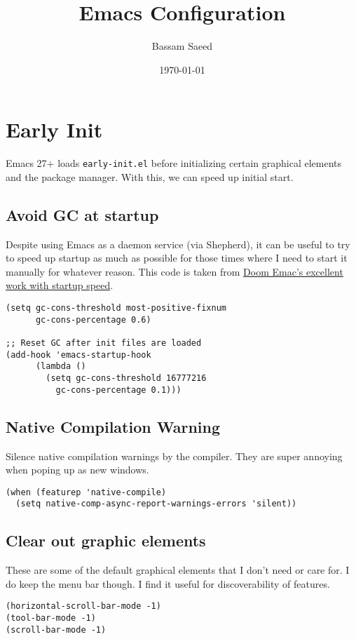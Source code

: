 \documentclass[11pt]{article}
\author{Bassam Saeed}
\date{\today}
\title{Emacs Configuration}
\begin{document}
\maketitle
\tableofcontents


\section{Early Init}
\label{sec:org3e512f7}
Emacs 27+ loads \texttt{early-init.el} before initializing certain graphical
elements and the package manager. With this, we can speed up initial
start.
\subsection{Avoid GC at startup}
\label{sec:org580bf67}
Despite using Emacs as a daemon service (via Shepherd), it can be
useful to try to speed up startup as much as possible for those times
where I need to start it manually for whatever reason. This code is
taken from \href{https://github.com/doomemacs/doomemacs/blob/develop/docs/faq.org\#how-does-doom-start-up-so-quickly}{Doom Emac's excellent work with startup speed}.
\begin{verbatim}
(setq gc-cons-threshold most-positive-fixnum
      gc-cons-percentage 0.6)

;; Reset GC after init files are loaded
(add-hook 'emacs-startup-hook
	  (lambda ()
	    (setq gc-cons-threshold 16777216
		  gc-cons-percentage 0.1)))
\end{verbatim}

\subsection{Native Compilation Warning}
\label{sec:orged78b1e}
Silence native compilation warnings by the compiler. They are super
annoying when poping up as new windows.
\begin{verbatim}
(when (featurep 'native-compile)
  (setq native-comp-async-report-warnings-errors 'silent))
\end{verbatim}

\subsection{Clear out graphic elements}
\label{sec:org848c00d}
These are some of the default graphical elements that I don't need or
care for. I do keep the menu bar though. I find it useful for
discoverability of features.
\begin{verbatim}
(horizontal-scroll-bar-mode -1)
(tool-bar-mode -1)
(scroll-bar-mode -1)
\end{verbatim}
\end{document}
